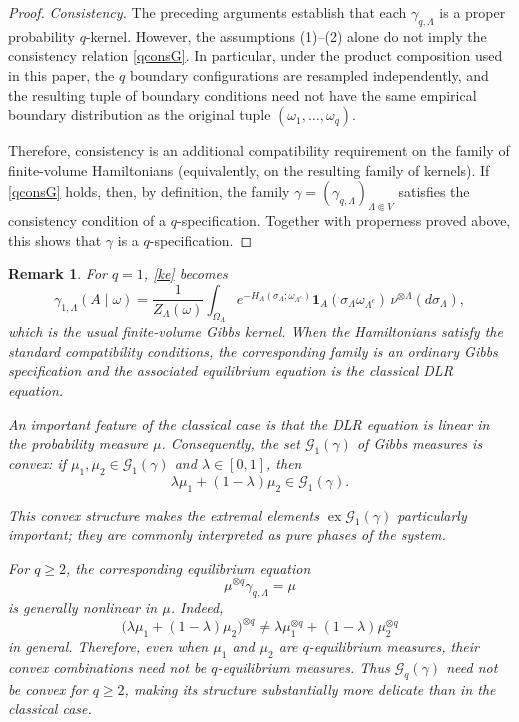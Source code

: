 \documentclass[11pt,reqno]{amsart}
\newtheorem{rk}{Remark}
\numberwithin{equation}{section} \setcounter{tocdepth}{1}
\begin{document}
\begin{proof}
	\medskip
	
	\noindent
	\textit{Consistency.}
	The preceding arguments establish that each
	$\gamma_{q,\Lambda}$ is a proper probability $q$-kernel. However,
	the assumptions (1)--(2) alone do not imply the consistency relation
	\eqref{qconsG}. In particular, under the product composition used in
	this paper, the $q$ boundary configurations are resampled
	independently, and the resulting tuple of boundary conditions need
	not have the same empirical boundary distribution as the original
	tuple $(\omega_1,\ldots,\omega_q)$.
	
	Therefore, consistency is an additional compatibility requirement on
	the family of finite-volume Hamiltonians (equivalently, on the
	resulting family of kernels). If \eqref{qconsG} holds, then, by
	definition, the family
	$\gamma=(\gamma_{q,\Lambda})_{\Lambda\Subset V}$ satisfies the
	consistency condition of a $q$-specification. Together with
	properness proved above, this shows that $\gamma$ is a
	$q$-specification.
\end{proof}

\begin{rk}
	For $q=1$, \eqref{ke} becomes
	\[
	\gamma_{1,\Lambda}(A\mid\omega)
	=
	\frac{1}{Z_\Lambda(\omega)}
	\int_{\Omega_\Lambda}
	e^{-H_\Lambda(\sigma_\Lambda;\omega_{\Lambda^c})}
	\mathbf{1}_A(\sigma_\Lambda\omega_{\Lambda^c})
	\,\nu^{\otimes\Lambda}(d\sigma_\Lambda),
	\]
	which is the usual finite-volume Gibbs kernel. When the Hamiltonians
	satisfy the standard compatibility conditions, the corresponding
	family is an ordinary Gibbs specification and the associated
	equilibrium equation is the classical DLR equation.
	
	An important feature of the classical case is that the DLR equation
	is linear in the probability measure $\mu$. Consequently, the set
	$\mathcal G_1(\gamma)$ of Gibbs measures is convex: if
	$\mu_1,\mu_2\in\mathcal G_1(\gamma)$ and $\lambda\in[0,1]$, then
	\[
	\lambda\mu_1+(1-\lambda)\mu_2
	\in
	\mathcal G_1(\gamma).
	\]
	
	This convex structure makes the extremal elements
	$\operatorname{ex}\mathcal G_1(\gamma)$ particularly important; they
	are commonly interpreted as pure phases of the system.
	
	For $q\ge2$, the corresponding equilibrium equation
	\[
	\mu^{\otimes q}\gamma_{q,\Lambda}=\mu
	\]
	is generally nonlinear in $\mu$. Indeed,
	\[
	\bigl(\lambda\mu_1+(1-\lambda)\mu_2\bigr)^{\otimes q}
	\neq
	\lambda\mu_1^{\otimes q}
	+
	(1-\lambda)\mu_2^{\otimes q}
	\]
	in general. Therefore, even when $\mu_1$ and $\mu_2$ are
	$q$-equilibrium measures, their convex combinations need not be
	$q$-equilibrium measures. Thus
	$\mathcal G_q(\gamma)$ need not be convex for $q\ge2$, making its
	structure substantially more delicate than in the classical case.
\end{rk}
\end{document}
